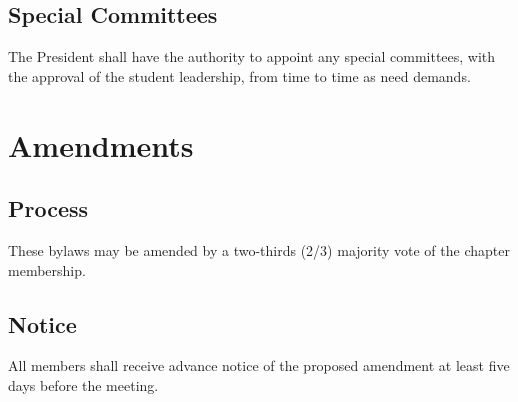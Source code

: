 \documentclass[12pt, a4paper]{article}
\begin{document}
\subsection{Special Committees}
The President shall have the authority to appoint any special committees, with the approval of the student leadership, from time to time as need demands.
\section{Amendments}
\subsection{Process}
These bylaws may be amended by a two-thirds (2/3) majority vote of the chapter membership.
\subsection{Notice}
All members shall receive advance notice of the proposed amendment at least five days before the meeting. 
\end{document}
